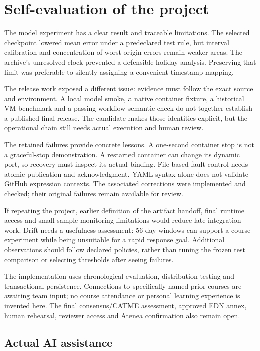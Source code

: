 \documentclass[a4paper,11pt]{article}
\begin{document}
\section{Self-evaluation of the project}

The model experiment has a clear result and traceable limitations. The selected
checkpoint lowered mean error under a predeclared test rule, but interval
calibration and concentration of worst-origin errors remain weaker areas. The
archive's unresolved clock prevented a defensible holiday analysis. Preserving
that limit was preferable to silently assigning a convenient timestamp mapping.

The release work exposed a different issue: evidence must follow the exact source
and environment. A local model smoke, a native container fixture, a historical VM
benchmark and a passing workflow-semantic check do not together establish a
published final release. The candidate makes those identities explicit, but the
operational chain still needs actual execution and human review.

The retained failures provide concrete lessons. A one-second container stop is
not a graceful-stop demonstration. A restarted container can change its dynamic
port, so recovery must inspect its actual binding. File-based fault control needs
atomic publication and acknowledgment. YAML syntax alone does not validate
GitHub expression contexts. The associated corrections were implemented and
checked; their original failures remain available for review.

If repeating the project, earlier definition of the artifact handoff, final
runtime access and small-sample monitoring limitations would reduce late
integration work. Drift needs a usefulness assessment: 56-day windows can
support a course experiment while being unsuitable for a rapid response goal.
Additional observations should follow declared policies, rather than tuning the
frozen test comparison or selecting thresholds after seeing failures.

The implementation uses chronological evaluation, distribution testing and
transactional persistence. Connections to specifically named prior courses are
awaiting team input; no course attendance or personal learning experience is
invented here. The final consensus/CATME assessment, approved EDN annex, human
rehearsal, reviewer access and Atenea confirmation also remain open.

\subsection{Actual AI assistance}
\end{document}
